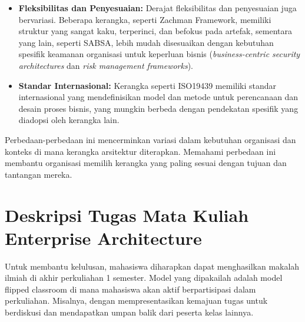 \begin{itemize}
	\item \textbf{Fleksibilitas dan Penyesuaian:} Derajat fleksibilitas dan penyesuaian juga bervariasi. Beberapa kerangka, seperti Zachman Framework, memiliki struktur yang sangat kaku, terperinci, dan befokus pada artefak, sementara yang lain, seperti SABSA, lebih mudah disesuaikan dengan kebutuhan spesifik keamanan organisasi untuk keperluan bisnis (\textit{business-centric security architectures} dan \textit{risk management frameworks}).
	
	\item \textbf{Standar Internasional:} Kerangka seperti ISO19439 memiliki standar internasional yang mendefinisikan model dan metode untuk perencanaan dan desain proses bisnis, yang mungkin berbeda dengan pendekatan spesifik yang diadopsi oleh kerangka lain.
\end{itemize}

Perbedaan-perbedaan ini mencerminkan variasi dalam kebutuhan organisasi dan konteks di mana kerangka arsitektur diterapkan. Memahami perbedaan ini membantu organisasi memilih kerangka yang paling sesuai dengan tujuan dan tantangan mereka.

\section{Deskripsi Tugas Mata Kuliah Enterprise Architecture}
Untuk membantu kelulusan, mahasiswa diharapkan dapat menghasilkan makalah ilmiah di akhir perkuliahan 1 semester. Model yang dipakailah adalah model flipped classroom di mana mahasiswa akan aktif berpartisipasi dalam perkuliahan. Misalnya, dengan mempresentasikan kemajuan tugas untuk berdiskusi dan mendapatkan umpan balik dari peserta kelas lainnya.

